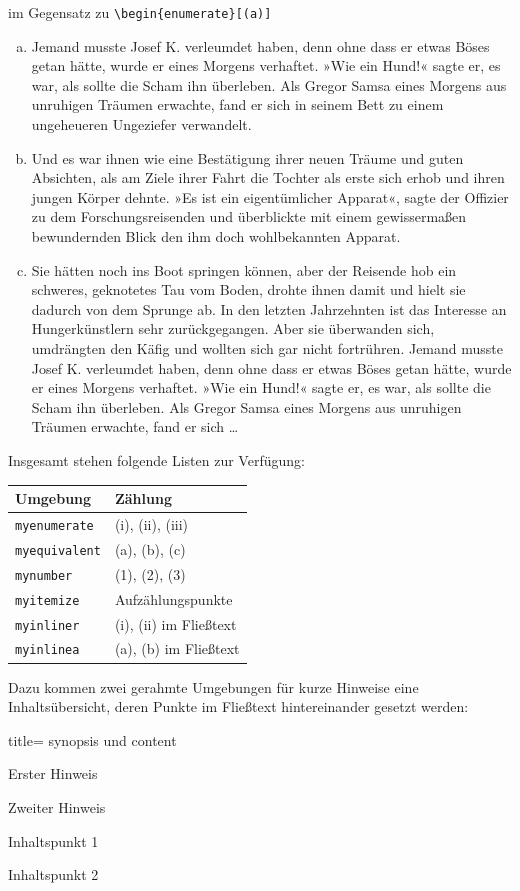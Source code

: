%
im Gegensatz zu \verb|\begin{enumerate}[(a)]|
%
\begin{enumerate}[(a)]
	\item
	Jemand musste Josef K. verleumdet haben, denn ohne dass er etwas Böses getan hätte, wurde er eines Morgens verhaftet. »Wie ein Hund!« sagte er, es war, als sollte die Scham ihn überleben. Als Gregor Samsa eines Morgens aus unruhigen Träumen erwachte, fand er sich in seinem Bett zu einem ungeheueren Ungeziefer verwandelt. 
	
	\item
	Und es war ihnen wie eine Bestätigung ihrer neuen Träume und guten Absichten, als am Ziele ihrer Fahrt die Tochter als erste sich erhob und ihren jungen Körper dehnte. 
	»Es ist ein eigentümlicher Apparat«, sagte der Offizier zu dem Forschungsreisenden und überblickte mit einem gewissermaßen bewundernden Blick den ihm doch wohlbekannten Apparat. 
	
	\item
	Sie hätten noch ins Boot springen können, aber der Reisende hob ein schweres, geknotetes Tau vom Boden, drohte ihnen damit und hielt sie dadurch von dem Sprunge ab. 
	In den letzten Jahrzehnten ist das Interesse an Hungerkünstlern sehr zurückgegangen. 
	Aber sie überwanden sich, umdrängten den Käfig und wollten sich gar nicht fortrühren.
	Jemand musste Josef K. verleumdet haben, denn ohne dass er etwas Böses getan hätte, wurde er eines Morgens verhaftet. »Wie ein Hund!« sagte er, es war, als sollte die Scham ihn überleben. 
	Als Gregor Samsa eines Morgens aus unruhigen Träumen erwachte, fand er sich \ldots
	
\end{enumerate}
%
Insgesamt stehen folgende Listen zur Verfügung:
%
\begin{center}
\begin{tabular}{ll}\toprule
Umgebung & Zählung \\ \midrule
\texttt{myenumerate} & (i), (ii), (iii) \\
\texttt{myequivalent} & (a), (b), (c) \\
\texttt{mynumber} & (1), (2), (3) \\
\texttt{myitemize} & Aufzählungspunkte \\
\texttt{myinliner} & (i), (ii) im Fließtext \\
\texttt{myinlinea} & (a), (b) im Fließtext \\ \bottomrule
\end{tabular}
\end{center}
%
Dazu kommen zwei gerahmte Umgebungen für kurze Hinweise \bzw eine Inhaltsübersicht, deren Punkte im Fließtext hintereinander gesetzt werden:
%
\begin{tcblisting}{title= synopsis und content}
\begin{synopsis}
\item Erster Hinweis \item Zweiter Hinweis
\end{synopsis}
\begin{content}
\item Inhaltspunkt 1 \item Inhaltspunkt 2
\end{content}
\end{tcblisting}
%

